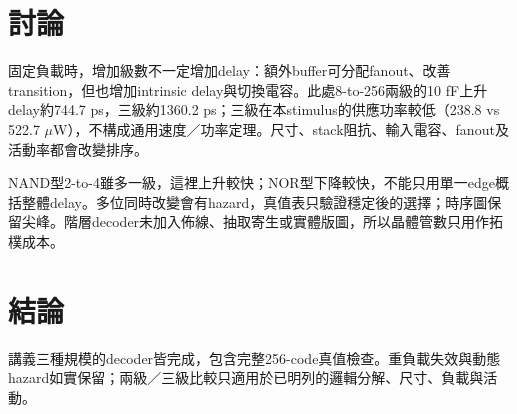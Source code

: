 \section{討論}
固定負載時，增加級數不一定增加delay：額外buffer可分配fanout、改善transition，但也增加intrinsic delay與切換電容。此處8-to-256兩級的10 fF上升delay約744.7 ps，三級約1360.2 ps；三級在本stimulus的供應功率較低（238.8 vs 522.7 $\mu$W），不構成通用速度／功率定理。尺寸、stack阻抗、輸入電容、fanout及活動率都會改變排序。

NAND型2-to-4雖多一級，這裡上升較快；NOR型下降較快，不能只用單一edge概括整體delay。多位同時改變會有hazard，真值表只驗證穩定後的選擇；時序圖保留尖峰。階層decoder未加入佈線、抽取寄生或實體版圖，所以晶體管數只用作拓樸成本。

\section{結論}
講義三種規模的decoder皆完成，包含完整256-code真值檢查。重負載失效與動態hazard如實保留；兩級／三級比較只適用於已明列的邏輯分解、尺寸、負載與活動。
